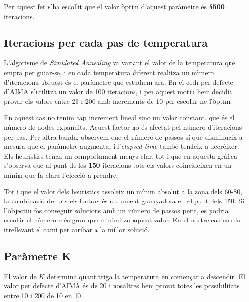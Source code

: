 Per aquest fet s'ha escollit que el valor òptim d'aquest paràmetre és \textbf{5500} iteracions.


\newpage
\subsection{Iteracions per cada pas de temperatura} %
\label{sub:iteracions_per_cada_pas}

L'algorisme de \emph{Simulated Annealing} va variant el valor de la temperatura que empra per guiar-se, i en cada temperatura diferent realitza un número d'iteracions. Aquest és el paràmetre que estudiem ara. En el codi per defecte d'AIMA s'utilitza un valor de 100 iteracions, i per aquest motiu hem decidit provar els valors entre 20 i 200 amb increments de 10 per escollir-ne l'òptim.


En aquest cas no tenim cap increment lineal sino un valor constant, que és el número de nodes expandits. Aquest factor no és afectat pel número d'iteracions per pas. Per altra banda, observem que el número de passos sí que disminueix a mesura que el paràmetre augmenta, i l'\emph{elapsed time} també tendeix a decréixer. Els heurístics tenen un comportament menys clar, tot i que en aquesta gràfica s'observa que al punt de les \textbf{150} iteracions tots els valors coincideixen en un mínim que fa clara l'elecció a prendre.

Tot i que el valor dels heurístics assoleix un mínim absolut a la zona dels 60-80, la combinació de tots els factors és clarament guanyadora en el punt dels 150. Si l'objectiu fos conseguir solucions amb un número de passos petit, es podria escollir el número més gran que minimitza aquest valor. En el nostre cas ens és irrellevant el camí per arribar a la millor solució.


\newpage
\subsection{Paràmetre K} %
\label{sub:parametre_k}

El valor de $K$ determina quant triga la temperatura en començar a descendir. El valor per defecte d'AIMA és de 20 i nosaltres hem provat totes les possibilitats entre 10 i 200 de 10 en 10.


